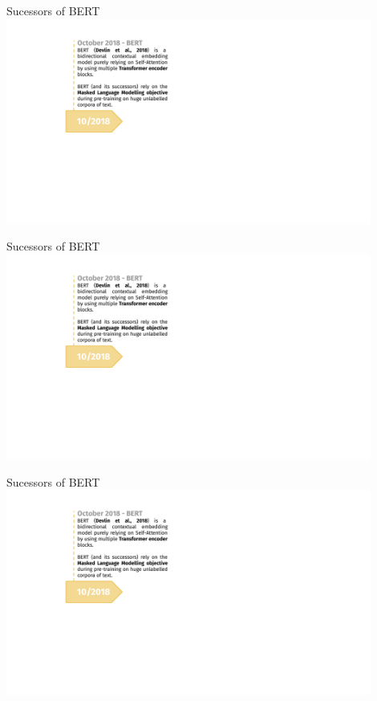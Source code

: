 \begin{frame}{Sucessors of BERT}
\hbox{\hspace{-0.5em} \includegraphics[width=12cm,page=1]{figure/transfer_learning_timeline3_nlp.pdf}}
\end{frame}
\begin{frame}[noframenumbering]{Sucessors of BERT}
\hbox{\hspace{-0.5em} \includegraphics[width=12cm,page=2]{figure/transfer_learning_timeline3_nlp.pdf}}
\end{frame}
\begin{frame}[noframenumbering]{Sucessors of BERT}
\hbox{\hspace{-0.5em} \includegraphics[width=12cm,page=3]{figure/transfer_learning_timeline3_nlp.pdf}}
\end{frame}
